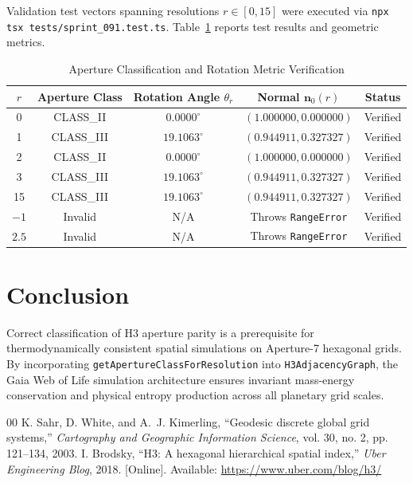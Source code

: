 \documentclass[10pt,journal,compsoc]{IEEEtran}
\begin{document}
Validation test vectors spanning resolutions $r \in [0, 15]$ were executed via \texttt{npx tsx tests/sprint\_091.test.ts}. Table~\ref{tab:verification} reports test results and geometric metrics.

\begin{table}[htbp]
\caption{Aperture Classification and Rotation Metric Verification}
\label{tab:verification}
\centering
\begin{tabular}{ccccc}
\toprule
$r$ & Aperture Class & Rotation Angle $\theta_r$ & Normal $\mathbf{n}_0(r)$ & Status \\
\midrule
0 & CLASS\_II  & $0.0000^\circ$ & $(1.000000, 0.000000)$ & Verified \\
1 & CLASS\_III & $19.1063^\circ$ & $(0.944911, 0.327327)$ & Verified \\
2 & CLASS\_II  & $0.0000^\circ$ & $(1.000000, 0.000000)$ & Verified \\
3 & CLASS\_III & $19.1063^\circ$ & $(0.944911, 0.327327)$ & Verified \\
15 & CLASS\_III & $19.1063^\circ$ & $(0.944911, 0.327327)$ & Verified \\
$-1$ & Invalid & N/A & Throws \texttt{RangeError} & Verified \\
$2.5$ & Invalid & N/A & Throws \texttt{RangeError} & Verified \\
\bottomrule
\end{tabular}
\end{table}

\section{Conclusion}
Correct classification of H3 aperture parity is a prerequisite for thermodynamically consistent spatial simulations on Aperture-7 hexagonal grids. By incorporating \texttt{getApertureClassForResolution} into \texttt{H3AdjacencyGraph}, the Gaia Web of Life simulation architecture ensures invariant mass-energy conservation and physical entropy production across all planetary grid scales.

\begin{thebibliography}{00}
 K. Sahr, D. White, and A.~J. Kimerling, ``Geodesic discrete global grid systems,'' \emph{Cartography and Geographic Information Science}, vol. 30, no. 2, pp. 121--134, 2003.
 I. Brodsky, ``H3: A hexagonal hierarchical spatial index,'' \emph{Uber Engineering Blog}, 2018. [Online]. Available: \url{https://www.uber.com/blog/h3/}
\end{thebibliography}
\end{document}
